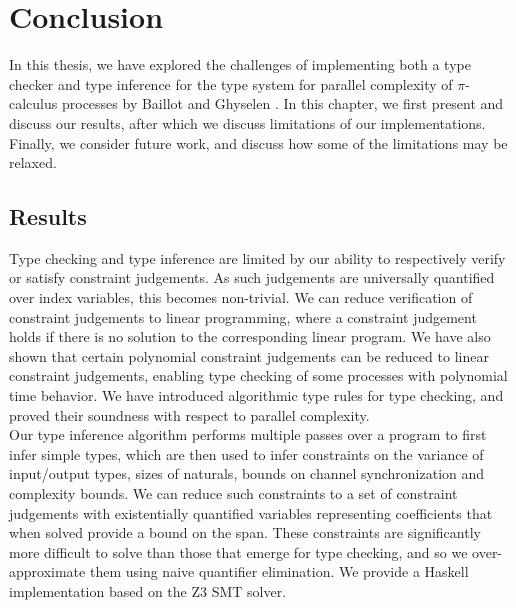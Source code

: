 \chapter{Conclusion}\label{ch:conclusion}
In this thesis, we have explored the challenges of implementing both a type checker and type inference for the type system for parallel complexity of $\pi$-calculus processes by Baillot and Ghyselen \cite{BaillotGhyselen2021}. In this chapter, we first present and discuss our results, after which we discuss limitations of our implementations. Finally, we consider future work, and discuss how some of the limitations may be relaxed.
%
\section{Results}
Type checking and type inference are limited by our ability to respectively verify or satisfy constraint judgements. As such judgements are universally quantified over index variables, this becomes non-trivial. We can reduce verification of constraint judgements to linear programming, where a constraint judgement holds if there is no solution to the corresponding linear program. We have also shown that certain polynomial constraint judgements can be reduced to linear constraint judgements, enabling type checking of some processes with polynomial time behavior. We have introduced algorithmic type rules for type checking, and proved their soundness with respect to parallel complexity.\\ %

Our type inference algorithm performs multiple passes over a program to first infer simple types, which are then used to infer constraints on the variance of input/output types, sizes of naturals, bounds on channel synchronization and complexity bounds. We can reduce such constraints to a set of constraint judgements with existentially quantified variables representing coefficients that when solved provide a bound on the span. These constraints are significantly more difficult to solve than those that emerge for type checking, and so we over-approximate them using naive quantifier elimination. We provide a Haskell implementation based on the Z3 SMT solver.\\

